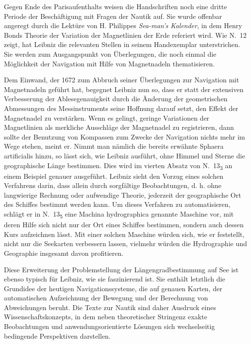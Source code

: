 Gegen Ende des Parisaufenthalts weisen die Handschriften noch eine dritte Periode der Besch\"{a}ftigung mit Fragen der Nautik auf. Sie wurde offenbar ange\-regt durch die Lekt\"{u}re von H. Philippes \textit{Sea-man's Kalender}, in dem Henry Bonds Theorie der Variation der Magnetlinien der Erde referiert wird. Wie N.~12 zeigt, hat Leibniz die relevanten Stellen in seinem Handexemplar unterstrichen. Sie werden zum Ausgangspunkt von \"{U}berlegungen, die noch einmal die M\"{o}glichkeit der Navigation mit Hilfe von Magnetnadeln thematisieren.\par
Dem Einwand, der 1672 zum Abbruch seiner \"{U}berlegungen zur Navigation mit Magnetnadeln gef\"{u}hrt hat, begegnet Leibniz nun so, dass er statt der extensiven Verbesserung der Ablesegenauigkeit durch die \"{A}nderung der geometrischen Abmessungen des Messinstruments seine Hoffnung darauf setzt, den Effekt der Magnetnadel zu verst\"{a}rken. Wenn es gelingt, geringe Variationen der Magnetlinien als merkliche Ausschl\"{a}ge der Magnetnadel zu registrieren, dann sollte der Benutzung von Kompassen zum Zwecke der Navigation nichts mehr im Wege stehen, meint er. Nimmt man n\"{a}mlich die bereits erw\"{a}hnte Sphaera artificialis hinzu, so l\"{a}sst sich, wie Leibniz ausf\"{u}hrt, ohne Himmel und Sterne die geographische L\"{a}nge bestimmen. Dies wird im vierten Absatz von N.~13\textsubscript{3} an einem Beispiel genauer ausgef\"{u}hrt. Leibniz sieht den Vorzug eines solchen Verfahrens darin, dass allein durch sorgf\"{a}ltige Beobachtungen, d. h. ohne langwierige Rechnung oder auf\-wendige Theorie, jederzeit der geographische Ort des Schiffes bestimmt werden kann. 
Um dieses Verfahren zu automatisieren, schl\"{a}gt er in N.~13\textsubscript{5} eine Machina hydrographica genannte Maschine vor, mit deren Hilfe sich nicht nur der Ort eines Schiffes bestimmen, sondern auch dessen Kurs aufzeichnen l\"{a}sst. Mit einer solchen Maschine w\"{u}rden sich, wie er feststellt, nicht nur die Seekarten verbessern lassen, vielmehr w\"{u}rden die Hydrographie und Geographie insgesamt davon profitieren.\par
Diese Erweiterung der Problemstellung der L\"{a}ngengradbestimmung auf See ist ebenso typisch f\"{u}r Leibniz, wie sie faszinierend ist. Sie enth\"{a}lt letztlich die Grundidee der heutigen Navigationssysteme, die auf genauen Karten, der automatischen Aufzeichnung der Bewegung und der Berechnung von Abweichungen beruht. Die Texte zur Nautik sind daher Ausdruck eines Wissenschaftskonzepts, in dem neben theoretischer Stringenz exakte Beobachtungen und anwendungsorientierte L\"{o}sungen sich wechselseitig bedingende Perspektiven darstellen.\par\vspace{2.0ex}


